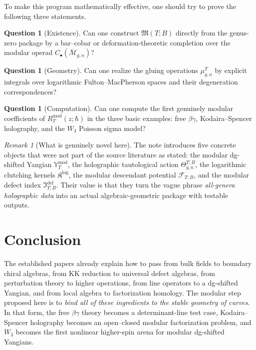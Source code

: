 \documentclass[11pt]{article}
\theoremstyle{definition}
\newtheorem{question}[theorem]{Question}
\theoremstyle{remark}
\newtheorem{remark}[theorem]{Remark}
\newcommand{\F}{\mathcal F}
\newcommand{\Kk}{\mathfrak K}
\newcommand{\M}{\mathcal M}
\newcommand{\ModEnv}{\mathfrak M}
\newcommand{\modu}{\mathrm{mod}}
\newcommand{\defect}{\mathrm{def}}
\newcommand{\bbeta}{\beta}
\newcommand{\bgamma}{\gamma}
\begin{document}
To make this program mathematically effective, one should try to prove the following three statements.

\begin{question}[Existence]
Can one construct $\ModEnv(T;B)$ directly from the genus-zero package by a bar--cobar or deformation-theoretic completion over the modular operad $C_\bullet(\overline{\M}_{g,n})$?
\end{question}

\begin{question}[Geometry]
Can one realize the gluing operations $\mu_{g,n}^T$ by explicit integrals over logarithmic Fulton--MacPherson spaces and their degeneration correspondences?
\end{question}

\begin{question}[Computation]
Can one compute the first genuinely modular coefficients of $R_T^{\modu}(z;\hbar)$ in the three basic examples: free $\bbeta\bgamma$, Kodaira--Spencer holography, and the $W_3$ Poisson sigma model?
\end{question}

\begin{remark}[What is genuinely novel here]
The note introduces five concrete objects that were not part of the source literature as stated: the modular dg-shifted Yangian $\mathbb Y_T^{\modu}$, the holographic tautological action $\Theta_{g,n}^{T;B}$, the logarithmic clutching kernels $\Kk^{\log}$, the modular descendant potential $\F_{T;B}$, and the modular defect index $\mathfrak I_{T;B}^{\defect}$. Their value is that they turn the vague phrase \emph{all-genera holographic data} into an actual algebraic-geometric package with testable outputs.
\end{remark}

\section{Conclusion}

The established papers already explain how to pass from bulk fields to boundary chiral algebras, from KK reduction to universal defect algebras, from perturbation theory to higher operations, from line operators to a dg-shifted Yangian, and from local algebra to factorization homology. The modular step proposed here is to \emph{bind all of these ingredients to the stable geometry of curves}. In that form, the free $\bbeta\bgamma$ theory becomes a determinant-line test case, Kodaira--Spencer holography becomes an open--closed modular factorization problem, and $W_3$ becomes the first nonlinear higher-spin arena for modular dg-shifted Yangians.

\begingroup\footnotesize\setlength{\bibitemsep}{0pt}\printbibliography\endgroup
\end{document}

